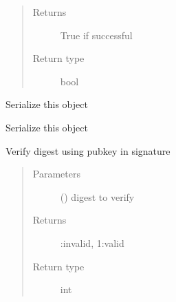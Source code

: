 \documentclass[letterpaper,10pt,english]{sphinxmanual}
\begin{document}
\begin{fulllineitems}
\begin{fulllineitems}
\begin{quote}
\begin{description}
\item[{Returns}] \leavevmode
True if successful

\item[{Return type}] \leavevmode
bool

\end{description}\end{quote}

\end{fulllineitems}


\begin{fulllineitems}
\label{\detokenize{bbc1.core.bbclib:bbc1.core.bbclib.BBcSignature.serialize}}
Serialize this object

\end{fulllineitems}


\begin{fulllineitems}
\label{\detokenize{bbc1.core.bbclib:bbc1.core.bbclib.BBcSignature.serialize_bson}}
Serialize this object

\end{fulllineitems}


\begin{fulllineitems}
\label{\detokenize{bbc1.core.bbclib:bbc1.core.bbclib.BBcSignature.verify}}
Verify digest using pubkey in signature
\begin{quote}\begin{description}
\item[{Parameters}] \leavevmode
{} () \textendash{} digest to verify

\item[{Returns}] :invalid, 1:valid

\item[{Return type}] \leavevmode
int

\end{description}\end{quote}

\end{fulllineitems}


\end{fulllineitems}
\end{document}
